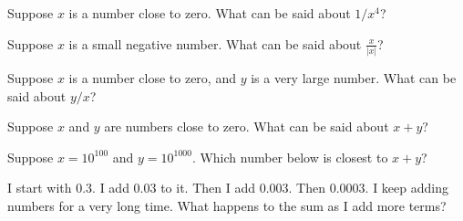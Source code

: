 \documentclass{ximera}
\begin{document}
\begin{shuffle}
\begin{problem}
  Suppose $x$ is a number close to zero.  What can be said about $1/x^4$?
  \begin{multipleChoice}
  \end{multipleChoice}
\end{problem}

\begin{problem}
  Suppose $x$ is a small negative number.  What can be said about $\frac{x}{|x|}$?
  \begin{multipleChoice}
  \end{multipleChoice}
\end{problem}

\begin{problem}
  Suppose $x$ is a number close to zero, and $y$ is a very large number.  What can be said about $y/x$?
  \begin{multipleChoice}
  \end{multipleChoice}
\end{problem}

\begin{problem}
  Suppose $x$ and $y$ are numbers close to zero.  What can be said about $x+y$?
  \begin{multipleChoice}
  \end{multipleChoice}
\end{problem}

\begin{problem}
  Suppose $x = 10^{100}$ and $y = 10^{1000}$.  Which number below is closest to $x + y$?
  \begin{multipleChoice}
  \end{multipleChoice}
\end{problem}

\begin{problem}
  I start with $0.3$.  I add $0.03$ to it.  Then I add $0.003$.  Then $0.0003$.  I keep adding numbers for a very long time.  What happens to the sum as I add more terms?
  \begin{multipleChoice}
  \end{multipleChoice}
\end{problem}


\end{shuffle}
\end{document}
